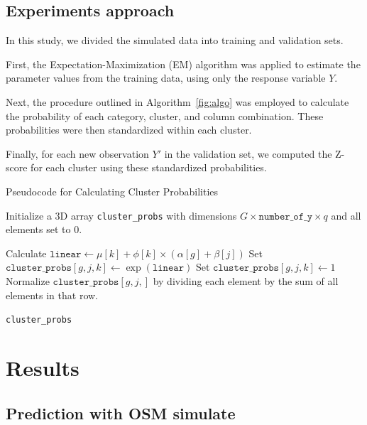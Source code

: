 \documentclass{article}
\begin{document}
\subsection{Experiments approach}

In this study, we divided the simulated data into training and validation sets.

First, the Expectation-Maximization (EM) algorithm was applied to estimate the parameter values from the training data, using only the response variable $Y$.

Next, the procedure outlined in Algorithm~\ref{fig:algo} was employed to calculate the probability of each category, cluster, and column combination. 
These probabilities were then standardized within each cluster.

Finally, for each new observation $Y'$ in the validation set, we computed the Z-score for each cluster using these standardized probabilities.
\begin{algorithm}
  \caption{Pseudocode for Calculating Cluster Probabilities}
  \label{fig:algo}
  \begin{algorithmic}[1]
  \STATE Initialize a 3D array \texttt{cluster\_probs} with dimensions $G \times \texttt{number\_of\_y} \times q$ and all elements set to 0.
  
                  \STATE Calculate $\texttt{linear} \gets \mu[k] + \phi[k] \times (\alpha[g] + \beta[j])$
                  \STATE Set $\texttt{cluster\_probs}[g, j, k] \gets \exp(\texttt{linear})$
              \ELSE
                  \STATE Set $\texttt{cluster\_probs}[g, j, k] \gets 1$
              \ENDIF
          \ENDFOR
          \STATE Normalize $\texttt{cluster\_probs}[g, j,]$ by dividing each element by the sum of all elements in that row.
      \ENDFOR
  \ENDFOR
  
  \RETURN \texttt{cluster\_probs}
  \end{algorithmic}
  \end{algorithm}


\section{Results}

\subsection{Prediction with OSM simulate}
\end{document}
